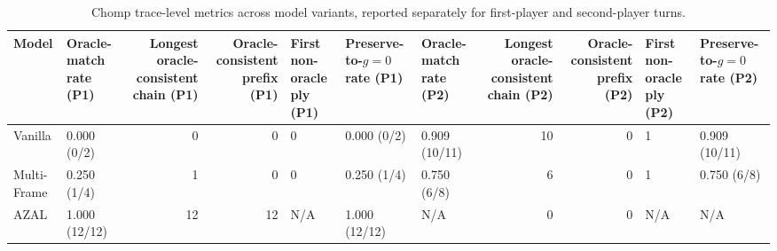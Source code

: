 \begin{table}[t]
\centering
\caption{Chomp trace-level metrics across model variants, reported separately for first-player and second-player turns.}
\label{tab:chomp_trace_metrics}
\begin{tabular}{llrrlllrrll}
\toprule
Model & Oracle-match rate (P1) & Longest oracle-consistent chain (P1) & Oracle-consistent prefix (P1) & First non-oracle ply (P1) & Preserve-to-$g=0$ rate (P1) & Oracle-match rate (P2) & Longest oracle-consistent chain (P2) & Oracle-consistent prefix (P2) & First non-oracle ply (P2) & Preserve-to-$g=0$ rate (P2) \\
\midrule
Vanilla & 0.000 (0/2) & 0 & 0 & 0 & 0.000 (0/2) & 0.909 (10/11) & 10 & 0 & 1 & 0.909 (10/11) \\
Multi-Frame & 0.250 (1/4) & 1 & 0 & 0 & 0.250 (1/4) & 0.750 (6/8) & 6 & 0 & 1 & 0.750 (6/8) \\
AZAL & 1.000 (12/12) & 12 & 12 & N/A & 1.000 (12/12) & N/A & 0 & 0 & N/A & N/A \\
\bottomrule
\end{tabular}
\end{table}
